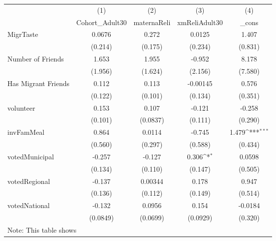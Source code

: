 {
\def\sym#1{\ifmmode^{#1}\else\(^{#1}\)\fi}
\begin{tabular}{l*{4}{c}}
\hline\hline
            &\multicolumn{1}{c}{(1)}&\multicolumn{1}{c}{(2)}&\multicolumn{1}{c}{(3)}&\multicolumn{1}{c}{(4)}\\
            &\multicolumn{1}{c}{Cohort\_Adult30}&\multicolumn{1}{c}{maternaReli}&\multicolumn{1}{c}{xmReliAdult30}&\multicolumn{1}{c}{\_cons}\\
\hline
MigrTaste   &      0.0676         &       0.272         &      0.0125         &       1.407         \\
            &     (0.214)         &     (0.175)         &     (0.234)         &     (0.831)         \\
[1em]
Number of Friends&       1.653         &       1.955         &      -0.952         &       8.178         \\
            &     (1.956)         &     (1.624)         &     (2.156)         &     (7.580)         \\
[1em]
Has Migrant Friends&       0.112         &       0.113         &    -0.00145         &       0.576         \\
            &     (0.122)         &     (0.101)         &     (0.134)         &     (0.351)         \\
[1em]
volunteer   &       0.153         &       0.107         &      -0.121         &      -0.258         \\
            &     (0.101)         &    (0.0837)         &     (0.111)         &     (0.290)         \\
[1em]
invFamMeal  &       0.864         &      0.0114         &      -0.745         &       1.479\sym{***}\\
            &     (0.560)         &     (0.297)         &     (0.588)         &     (0.434)         \\
[1em]
votedMunicipal&      -0.257         &      -0.127         &       0.306\sym{*}  &      0.0598         \\
            &     (0.134)         &     (0.110)         &     (0.147)         &     (0.505)         \\
[1em]
votedRegional&      -0.137         &     0.00344         &       0.178         &       0.947         \\
            &     (0.136)         &     (0.112)         &     (0.149)         &     (0.514)         \\
[1em]
votedNational&      -0.132         &      0.0956         &       0.154         &     -0.0184         \\
            &    (0.0849)         &    (0.0699)         &    (0.0929)         &     (0.320)         \\
\hline\hline
\multicolumn{5}{l}{\footnotesize Note: This table shows}\\
\end{tabular}
}
